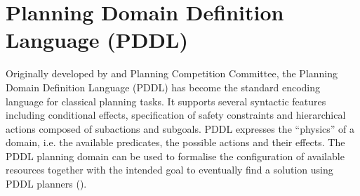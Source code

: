 \section{Planning Domain Definition Language (PDDL)}\label{subsec:PDDL}
Originally developed by \cite{mcdermott1998pddl} and Planning Competition Committee, the Planning Domain Definition Language (PDDL) has become the standard encoding language for classical planning tasks. It supports several syntactic features including conditional effects, specification of safety constraints and hierarchical actions composed of subactions and subgoals. PDDL expresses the ``physics'' of a domain, i.e. the available predicates, the possible actions and their effects.
The PDDL planning domain can be used to formalise the configuration of available resources together with the intended goal to eventually find a solution using PDDL planners  (\cite{huckaby2013planning}). 
%

